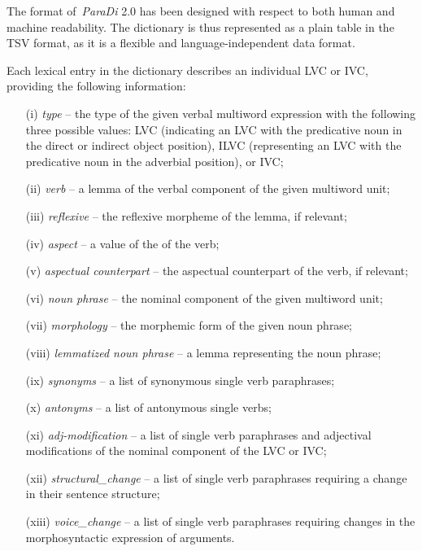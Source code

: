 \documentclass[output=paper,modfonts,nonflat]{langsci/langscibook}
\begin{document}
The format of~\emph{ParaDi} 2.0 has been designed with respect to both human 
and machine readability. The dictionary is thus represented as a plain table 
in the TSV format, as it is a flexible and language-independent data format.

Each lexical entry in the dictionary describes an individual LVC or IVC,
providing the following information:

\begin{itemize}
    \item[(i)] \emph{type} -- the type of the given verbal multiword expression 
     with the following three possible values: LVC (indicating an LVC with the 
     predicative noun in the direct or indirect object position), ILVC (representing an LVC 
     with the predicative noun in the adverbial position), or IVC;
   \item[(ii)] \emph{verb} -- a lemma of the verbal component of the given multiword unit;
   \item[(iii)] \emph{reflexive} -- the reflexive morpheme of the lemma, if relevant;
   \item[(iv)] \emph{aspect} -- a value of the  of the verb;
   \item[(v)]  \emph{aspectual counterpart} -- the aspectual counterpart of the verb, if relevant;
   \item[(vi)] \emph{noun phrase} -- the nominal component of the given multiword unit;
   \item[(vii)] \emph{morphology} -- the morphemic form of the given noun phrase;
   \item[(viii)] \emph{lemmatized noun phrase} -- a lemma representing the noun phrase;
   \item[(ix)] \emph{synonyms} -- a list of synonymous single verb paraphrases;
   \item[(x)] \emph{antonyms}  -- a list of antonymous single verbs;
   \item[(xi)] \emph{adj-modification} --  a list of single verb paraphrases 
   and adjectival modifications of the nominal component of the LVC or IVC;
   \item[(xii)] \emph{structural\_change} --  a list of single verb paraphrases requiring a change in their sentence structure;
   \item[(xiii)] \emph{voice\_change} --   a list of single verb paraphrases requiring changes in the morphosyntactic expression of arguments.
\end{itemize}
	
\end{document}
